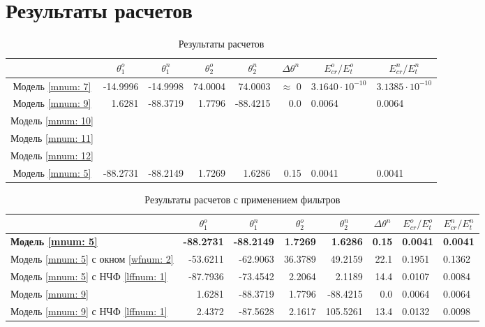 \section{Результаты расчетов}

\begin{table}
\footnotesize
\centering
\caption{Результаты расчетов}
\renewcommand{\arraystretch}{1.5}
\begin{tabularx}{\textwidth}{C|rr|rr|r|ll}
				& &  &  &  & &  &  \\ \hline
\hline Модель \ref{mnum: 7} & -14.9996 & -14.9998 & 74.0004 & 74.0003 & $\approx$ 0   & $3.1640 \cdot 10^{-10}$ & $3.1385 \cdot 10^{-10}$ \\ 
 	   Модель \ref{mnum: 9} & 1.6281 & -88.3719 & 1.7796  & -88.4215  & 0.0  & 0.0064 & 0.0064 \\
 	   Модель \ref{mnum: 10} &  &  &   &   &   &  &  \\
 	   Модель \ref{mnum: 11} &  &  &   &   &   &  &  \\
 	   Модель \ref{mnum: 12} &  &  &   &   &   &  &  \\
	   Модель \ref{mnum: 5} & -88.2731 & -88.2149 & 1.7269  & 1.6286  & 0.15 & 0.0041 & 0.0041 \\ 	   
 	   \hline
\end{tabularx} 
\renewcommand{\arraystretch}{1.0}
\end{table}

\begin{table}
\footnotesize
\centering
\caption{Результаты расчетов с применением фильтров}
\renewcommand{\arraystretch}{1.5}
\begin{tabularx}{\textwidth}{X|rr|rr|r|ll}
				&\multicolumn{1}{c}{$\theta_1^o$} & \multicolumn{1}{c|}{$\theta_1^n$} & \multicolumn{1}{c}{$\theta_2^o$} & \multicolumn{1}{c|}{$\theta_2^n$} & \multicolumn{1}{c|}{$\Delta\theta^n$}& \multicolumn{1}{c}{$E_{cr}^o/E_{t}^o$} & \multicolumn{1}{c}{$E_{cr}^n/E_{t}^n$} \\ \hline
\hline  \textbf{Модель \ref{mnum: 5}} 	& \textbf{-88.2731} & \textbf{-88.2149} & \textbf{1.7269} & \textbf{1.6286} & \textbf{0.15} & \textbf{0.0041} & \textbf{0.0041} \\
		Модель \ref{mnum: 5} с окном \ref{wfnum: 2}  & -53.6211 & -62.9063 & 36.3789 & 49.2159 & 22.1 & 0.1951 & 0.1362 \\
	    Модель \ref{mnum: 5} с НЧФ \ref{lffnum: 1}  	& -87.7936 & -73.4542 & 2.2064 & 2.1189 & 14.4 & 0.0107 & 0.0084 \\
\hline	Модель \ref{mnum: 9} & 1.6281 & -88.3719 & 1.7796  & -88.4215  & 0.0  & 0.0064 & 0.0064 \\
		Модель \ref{mnum: 9} с НЧФ \ref{lffnum: 1} & 2.4372 & -87.5628 & 2.1617  & 105.5261  & 13.4  & 0.0132 & 0.0098 \\
\end{tabularx} 
\renewcommand{\arraystretch}{1.0}
\end{table}
